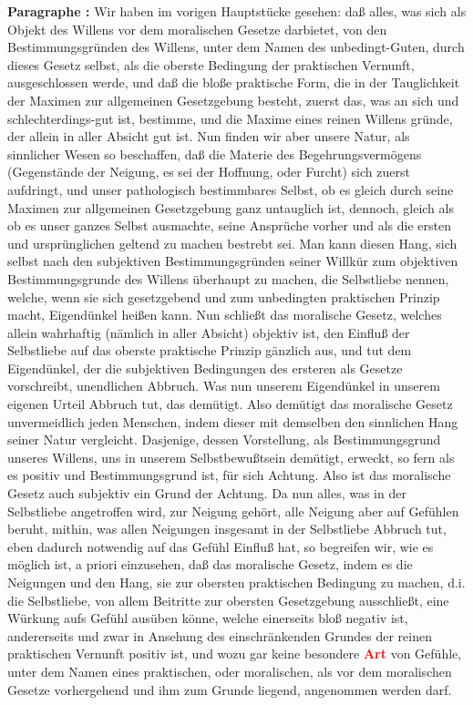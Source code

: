 \documentclass[a4paper,12pt,twoside]{book}
\newcommand{\match}[1]{\textcolor{red}{\textbf{#1}}}
\begin{document}
	\noindent\textbf{Paragraphe : }Wir haben im vorigen Hauptstücke gesehen: daß alles, was sich als Objekt des Willens vor dem moralischen Gesetze darbietet, von den Bestimmungsgründen des Willens, unter dem Namen des unbedingt-Guten, durch dieses Gesetz selbst, als die oberste Bedingung der praktischen Vernunft, ausgeschlossen werde, und daß die bloße praktische Form, die in der Tauglichkeit der Maximen zur allgemeinen Gesetzgebung besteht, zuerst das, was an sich und schlechterdings-gut ist, bestimme, und die Maxime eines reinen Willens gründe, der allein in aller Absicht gut ist. Nun finden wir aber unsere Natur, als sinnlicher Wesen so beschaffen, daß die Materie des Begehrungsvermögens (Gegenstände der Neigung, es sei der Hoffnung, oder Furcht) sich zuerst aufdringt, und unser pathologisch bestimmbares Selbst, ob es gleich durch seine Maximen zur allgemeinen Gesetzgebung ganz untauglich ist, dennoch, gleich als ob es unser ganzes Selbst ausmachte, seine Ansprüche vorher und als die ersten und ursprünglichen geltend zu machen bestrebt sei. Man kann diesen Hang, sich selbst nach den subjektiven Bestimmungsgründen seiner Willkür zum objektiven Bestimmungsgrunde des Willens überhaupt zu machen, die Selbstliebe nennen, welche, wenn sie sich gesetzgebend und zum unbedingten praktischen Prinzip macht, Eigendünkel heißen kann. Nun schließt das moralische Gesetz, welches allein wahrhaftig (nämlich in aller Absicht) objektiv ist, den Einfluß der Selbstliebe auf das oberste praktische Prinzip gänzlich aus, und tut dem Eigendünkel, der die subjektiven Bedingungen des ersteren als Gesetze vorschreibt, unendlichen Abbruch. Was nun unserem Eigendünkel in unserem eigenen Urteil Abbruch tut, das demütigt. Also demütigt das moralische Gesetz unvermeidlich  jeden Menschen, indem dieser mit demselben den sinnlichen Hang seiner Natur vergleicht. Dasjenige, dessen Vorstellung, als Bestimmungsgrund unseres Willens, uns in unserem Selbstbewußtsein demütigt, erweckt, so fern als es positiv und Bestimmungsgrund ist, für sich Achtung. Also ist das moralische Gesetz auch subjektiv ein Grund der Achtung. Da nun alles, was in der Selbstliebe angetroffen wird, zur Neigung gehört, alle Neigung aber auf Gefühlen beruht, mithin, was allen Neigungen insgesamt in der Selbstliebe Abbruch tut, eben dadurch notwendig auf das Gefühl Einfluß hat, so begreifen wir, wie es möglich ist, a priori einzusehen, daß das moralische Gesetz, indem es die Neigungen und den Hang, sie zur obersten praktischen Bedingung zu machen, d.i. die Selbstliebe, von allem Beitritte zur obersten Gesetzgebung ausschließt, eine Würkung aufs Gefühl ausüben könne, welche einerseits bloß negativ ist, andererseits und zwar in Ansehung des einschränkenden Grundes der reinen praktischen Vernunft positiv ist, und wozu gar keine besondere \match{Art} von Gefühle, unter dem Namen eines praktischen, oder moralischen, als vor dem moralischen Gesetze vorhergehend und ihm zum Grunde liegend, angenommen werden darf. 
	
\end{document}
